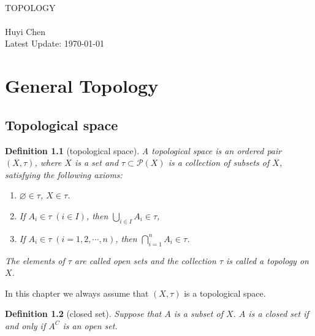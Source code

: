 \documentclass{report}
\newtheorem{definition}{Definition}[section]
\theoremstyle{nonumberplain}
\begin{document}
\begin{center}
	~\\
	\vspace{6em}
	\textsc{\Huge TOPOLOGY}
	~\\
	\vspace{2.5em}
	{\Large }
	~\\
	\vspace{6em}
	\textsf{Huyi Chen}
	~\\
	\vspace{5in}
	{\large Latest Update: \today}
\end{center}
\newpage

\tableofcontents

\chapter{General Topology}
\section{Topological space}
\begin{definition}[topological space]
	A \emph{topological space} is an ordered pair $(X,\tau)$, where $X$ is a set and $\tau\subset\mathcal{P}(X)$ is a collection of subsets of $X$, satisfying the following axioms:
	\begin{enumerate}
		\item $\varnothing\in \tau$, $X\in \tau$.
		\item If $A_i\in\tau\;(i\in I)$, then $\bigcup\limits_{i\in I}A_i\in \tau$,
		\item If $A_i\in\tau\;(i=1,2,\cdots,n)$, then $\bigcap\limits_{i=1}^nA_i\in \tau$.
	\end{enumerate}
	\noindent The elements of $\tau$ are called \emph{open sets} and the collection $\tau$ is called a \emph{topology} on $X$.
\end{definition}

\noindent In this chapter we always assume that $(X,\tau)$ is a topological space.


\begin{definition}[closed set]
	Suppose that $A$ is a subset of $X$. $A$ is a \emph{closed set} if and only if $A^C$ is an open set.
\end{definition}
\end{document}
